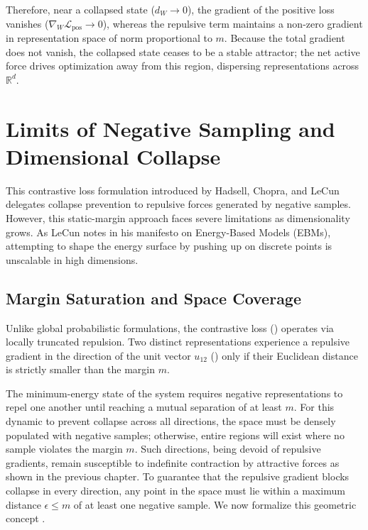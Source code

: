 \documentclass[11pt, oneside, openany]{book}
\begin{document}
Therefore, near a collapsed state ($d_{W} \to 0$), the gradient of the positive loss vanishes ($\nabla_{W} \mathcal{L}_{\text{pos}} \to 0$), whereas the repulsive term maintains a non-zero gradient in representation space of norm proportional to $m$. Because the total gradient does not vanish, the collapsed state ceases to be a stable attractor; the net active force drives optimization away from this region, dispersing representations across $\mathbb{R}^{d}$.

\section{Limits of Negative Sampling and Dimensional Collapse}
\label{sec:4.3}

This contrastive loss formulation introduced by Hadsell, Chopra, and LeCun \cite{hadsell2006dimensionality} delegates collapse prevention to repulsive forces generated by negative samples. However, this static-margin approach faces severe limitations as dimensionality grows. As LeCun \cite{lecun2022path} notes in his manifesto on Energy-Based Models (EBMs), attempting to shape the energy surface by pushing up on discrete points is unscalable in high dimensions.

\subsection{Margin Saturation and Space Coverage}
\label{sec:4.3.1}

Unlike global probabilistic formulations, the contrastive loss () operates via locally truncated repulsion. Two distinct representations experience a repulsive gradient in the direction of the unit vector $u_{12}$ () only if their Euclidean distance is strictly smaller than the margin $m$.

The minimum-energy state of the system requires negative representations to repel one another until reaching a mutual separation of at least $m$. For this dynamic to prevent collapse across all directions, the space must be densely populated with negative samples; otherwise, entire regions will exist where no sample violates the margin $m$. Such directions, being devoid of repulsive gradients, remain susceptible to indefinite contraction by attractive forces as shown in the previous chapter. To guarantee that the repulsive gradient blocks collapse in every direction, any point in the space must lie within a maximum distance $\epsilon \leq m$ of at least one negative sample. We now formalize this geometric concept \cite{vershynin2018high}.
\end{document}
